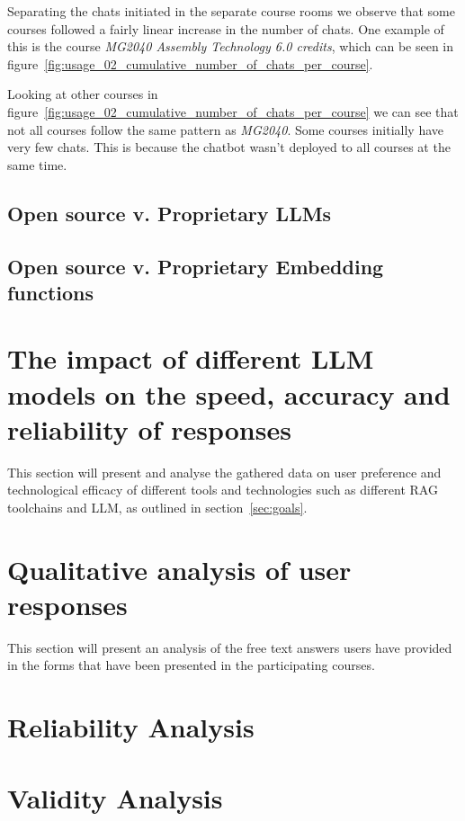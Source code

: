 


Separating the chats initiated in the separate course rooms we observe that some courses followed a fairly linear increase in the number of chats. One example of this is the course \textit{MG2040 Assembly Technology 6.0 credits}, which can be seen in figure~\ref{fig:usage_02_cumulative_number_of_chats_per_course}.





Looking at other courses in figure~\ref{fig:usage_02_cumulative_number_of_chats_per_course} we can see that not all courses follow the same pattern as \textit{MG2040}. Some courses initially have very few chats. This is because the chatbot wasn’t deployed to all courses at the same time.


\subsection{Open source v. Proprietary LLMs}


\subsection{Open source v. Proprietary Embedding functions}


\section{The impact of different LLM models on the speed, accuracy and reliability of responses}


This section will present and analyse the gathered data on user preference and technological efficacy of different tools and technologies such as different \gls{RAG} toolchains and \gls{LLM}, as outlined in section~\ref{sec:goals}.


\section{Qualitative analysis of user responses}


This section will present an analysis of the free text answers users have provided in the forms that have been presented in the participating courses.






\section{Reliability Analysis}




\section{Validity Analysis}




\cleardoublepage